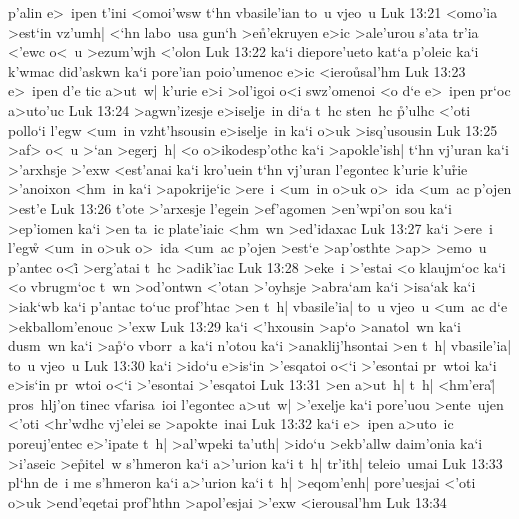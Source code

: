 p'alin
e>~ipen
t'ini
<omoi'wsw
t`hn
vbasile'ian
to~u
vjeo~u\bibvsend
\vs Luk 13:21
<omo'ia
>est`in
vz'umh|
<`hn
labo~usa
gun`h
>e\r{n}'ekruyen
e>ic
>ale'urou
s'ata
tr'ia
<'ewc
o<~u
>ezum'wjh
<'olon\bibvsend
\vs Luk 13:22
ka`i
diepore'ueto
kat`a
p'oleic
ka`i
k'wmac
did'askwn
ka`i
pore'ian
poio'umenoc
e>ic
<iero\r{u}sal'hm\bibvsend
{}
\vs Luk 13:23
e>~ipen
d'e
tic
a>ut~w|
k'urie
e>i
>ol'igoi
o<i
swz'omenoi
<o
d`e
e>~ipen
pr`oc
a>uto'uc\bibvsend
\vs Luk 13:24
>agwn'izesje
e>iselje~in
di`a
t~hc
sten~hc
\r{p}'ulhc
<'oti
pollo`i
l'egw
<um~in
vzht'hsousin
e>iselje~in
ka`i
o>uk
>isq'usousin\bibvsend
\vs Luk 13:25
>af>
o<~u
>`an
>egerj~h|
<o
o>ikodesp'othc
ka`i
>apokle'ish|
t`hn
vj'uran
ka`i
>'arxhsje
>'exw
<est'anai
ka`i
kro'uein
t`hn
vj'uran
l'egontec
k'urie
k'u\r{r}ie
>'anoixon
<hm~in
ka`i
>apokrije`ic
>ere~i
<um~in
o>uk
o>~ida
<um~ac
p'ojen
>est'e\bibvsend
\vs Luk 13:26
t'ote
>'arxesje
l'egein
>ef'agomen
>en'wpi'on
sou
ka`i
>ep'iomen
ka`i
>en
ta~ic
plate'iaic
<hm~wn
>ed'idaxac\bibvsend
\vs Luk 13:27
ka`i
>ere~i
l'eg\r{w}
<um~in
o>uk
o>~ida
<um~ac
p'ojen
>est`e
>ap'osthte
>ap>
>emo~u
p'antec
o<i\r{}
>erg'atai
t~hc
>adik'iac\bibvsend
\vs Luk 13:28
>eke~i
>'estai
<o
klaujm`oc
ka`i
<o
vbrugm`oc
t~wn
>od'ontwn
<'otan
>'oyhsje
>abra`am
ka`i
>isa`ak
ka`i
>iak`wb
ka`i
p'antac
to`uc
prof'htac
>en
t~h|
vbasile'ia|
to~u
vjeo~u
<um~ac
d`e
>ekballom'enouc
>'exw\bibvsend
\vs Luk 13:29
ka`i
<'hxousin
>ap`o
>anatol~wn
ka`i
dusm~wn
ka`i
>a\r{p}`o
vborr~a
ka`i
n'otou
ka`i
>anaklij'hsontai
>en
t~h|
vbasile'ia|
to~u
vjeo~u\bibvsend
\vs Luk 13:30
ka`i
>ido`u
e>is`in
>'esqatoi
o<`i
>'esontai
pr~wtoi
ka`i
e>is`in
pr~wtoi
o<`i
>'esontai
>'esqatoi\bibvsend
\vs Luk 13:31
>en
a>ut~h|
t~h|
<hm'era|\r{}
pros~hlj'on
tinec
vfarisa~ioi
l'egontec
a>ut~w|
>'exelje
ka`i
pore'uou
>ente~ujen
<'oti
<hr'wdhc
vj'elei
se
>apokte~inai\bibvsend
\vs Luk 13:32
ka`i
e>~ipen
a>uto~ic
poreuj'entec
e>'ipate
t~h|
>al'wpeki
ta'uth|
>ido`u
>ekb'allw
daim'onia
ka`i
>i'aseic
>e\r{p}itel~w
s'hmeron
ka`i
a>'urion
ka`i
t~h|
tr'ith|
teleio~umai\bibvsend
\vs Luk 13:33
pl`hn
de~i
me
s'hmeron
ka`i
a>'urion
ka`i
t~h|
>eqom'enh|
pore'uesjai
<'oti
o>uk
>end'eqetai
prof'hthn
>apol'esjai
>'exw
<ierousal'hm\bibvsend
\vs Luk 13:34
